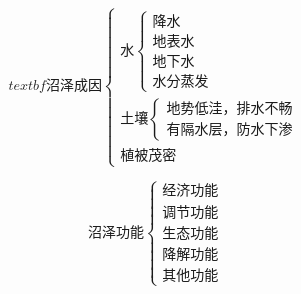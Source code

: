 \documentclass[UTF8]{ctexart}
\begin{document}
\par

\begin{multicols}{2}

    \[
        textbf{沼泽成因}
        \begin{cases}
            \text{水}
            \begin{cases}
                \text{降水}\\
                \text{地表水}\\
                \text{地下水}\\
                \text{水分蒸发}
            \end{cases}\\
            \text{土壤}
            \begin{cases}
                \text{地势低洼，排水不畅}\\
                \text{有隔水层，防水下渗}
            \end{cases}\\
            \text{植被茂密}
        \end{cases}
    \]

    \[
        \textbf{沼泽功能}
        \begin{cases}
            \text{经济功能}\\
            \text{调节功能}\\
            \text{生态功能}\\
            \text{降解功能}\\
            \text{其他功能}
        \end{cases}
    \]

\end{multicols}

\end{document}
